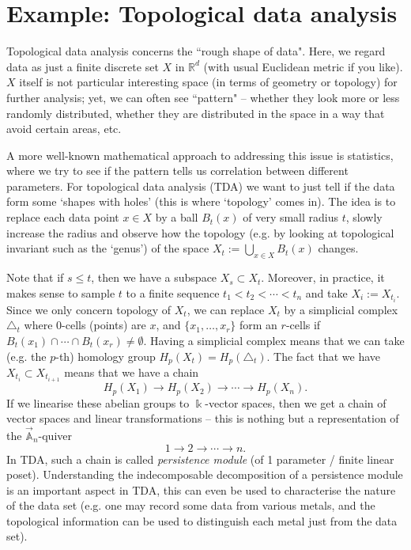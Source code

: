 \documentclass[11pt,a4paper]{article}
\numberwithin{equation}{section}
\theoremstyle{all}
\theoremstyle{remark}
\newcommand{\R}{\mathbb{R}}
\newcommand{\bbA}{\mathbb{A}}
\newcommand{\defn}[1]{\textsl{\color{darkblue} #1}}
\begin{document}
\pagebreak

\section{Example: Topological data analysis}

Topological data analysis concerns the ``rough shape of data".
Here, we regard data as just a finite discrete set $X$ in $\R^d$ (with usual Euclidean metric if you like).  $X$ itself is not particular interesting space (in terms of geometry or topology) for further analysis; yet, we can often see ``pattern" -- whether they look more or less randomly distributed, whether they are distributed in the space in a way that avoid certain areas, etc.

A more well-known mathematical approach to addressing this issue is statistics, where we try to see if the pattern tells us correlation between different parameters.
For topological data analysis (TDA) we want to just tell if the data form some `shapes with holes' (this is where `topology' comes in).
The idea is to replace each data point $x\in X$ by a ball $B_t(x)$ of very small radius $t$, slowly increase the radius and observe how the topology (e.g. by looking at topological invariant such as the `genus') of the space $X_t := \bigcup_{x\in X} B_t(x)$ changes.

Note that if $s\le t$, then we have a subspace $X_s \subset X_t$.
Moreover, in practice, it makes sense to sample $t$ to a finite sequence $t_1 < t_2 < \cdots < t_n$ and take $X_i:=X_{t_i}$.  Since we only concern topology of $X_t$, we can replace $X_t$ by a simplicial complex  $\triangle_t$ where $0$-cells (points) are $x$, and $\{x_1,\ldots, x_r\}$ form an $r$-cells if $B_t(x_1)\cap \cdots \cap B_t(x_r)\neq \emptyset$.  Having a simplicial complex means that we can take (e.g. the $p$-th) homology group $H_p(X_t) = H_p(\triangle_t)$.  The fact that we have $X_{t_i}\subset X_{t_{i+1}}$ means that we have a chain
\[
H_p(X_1) \to H_p(X_2) \to \cdots \to H_p(X_n).
\]
If we linearise these abelian groups to $\Bbbk$-vector spaces, then we get a chain of vector spaces and linear transformations -- this is nothing but a representation of the $\vec{\bbA}_n$-quiver 
\[
1\to 2\to \cdots \to n.
\]
In TDA, such a chain is called \defn{persistence module} (of 1 parameter / finite linear poset).
Understanding the indecomposable decomposition of a persistence module is an important aspect in TDA, this can even be used to characterise the nature of the data set (e.g. one may record some data from various metals, and the topological information can be used to distinguish each metal just from the data set).
\end{document}
